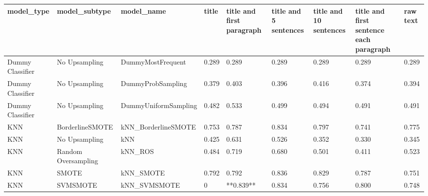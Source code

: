 \begin{tabular}{lllllllll}
\toprule
                  model\_type &       model\_subtype &                                   model\_name & title & title and first paragraph & title and 5 sentences & title and 10 sentences & title and first sentence each paragraph & raw text \\
\midrule
            Dummy Classifier &       No Upsampling &                            DummyMostFrequent & 0.289 &                     0.289 &                 0.289 &                  0.289 &                                   0.289 &    0.289 \\
            Dummy Classifier &       No Upsampling &                            DummyProbSampling & 0.379 &                     0.403 &                 0.396 &                  0.416 &                                   0.374 &    0.394 \\
            Dummy Classifier &       No Upsampling &                         DummyUniformSampling & 0.482 &                     0.533 &                 0.499 &                  0.494 &                                   0.491 &    0.491 \\
                         KNN &     BorderlineSMOTE &                          kNN\_BorderlineSMOTE & 0.753 &                     0.787 &                 0.834 &                  0.797 &                                   0.741 &    0.775 \\
                         KNN &       No Upsampling &                                          kNN & 0.425 &                     0.631 &                 0.526 &                  0.352 &                                   0.330 &    0.345 \\
                         KNN & Random Oversampling &                                      kNN\_ROS & 0.484 &                     0.719 &                 0.680 &                  0.501 &                                   0.411 &    0.523 \\
                         KNN &               SMOTE &                                    kNN\_SMOTE & 0.792 &                     0.792 &                 0.836 &                  0.829 &                                   0.787 &    0.751 \\
                         KNN &            SVMSMOTE &                                 kNN\_SVMSMOTE &     0 &                 **0.839** &                 0.834 &                  0.756 &                                   0.800 &    0.748 \\

\end{tabular}
